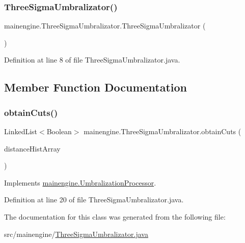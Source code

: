 \subsubsection{\texorpdfstring{Three\+Sigma\+Umbralizator()}{ThreeSigmaUmbralizator()}}
{\footnotesize\ttfamily mainengine.\+Three\+Sigma\+Umbralizator.\+Three\+Sigma\+Umbralizator (\begin{DoxyParamCaption}{ }\end{DoxyParamCaption})}



Definition at line 8 of file Three\+Sigma\+Umbralizator.\+java.



\subsection{Member Function Documentation}
\hypertarget{classmainengine_1_1_three_sigma_umbralizator_a56bfd8fcc856b38e503273e85c0ccf33}{}\label{classmainengine_1_1_three_sigma_umbralizator_a56bfd8fcc856b38e503273e85c0ccf33} 
\subsubsection{\texorpdfstring{obtain\+Cuts()}{obtainCuts()}}
{\footnotesize\ttfamily Linked\+List$<$Boolean$>$ mainengine.\+Three\+Sigma\+Umbralizator.\+obtain\+Cuts (\begin{DoxyParamCaption}\item[{Linked\+List$<$ Double $>$}]{distance\+Hist\+Array }\end{DoxyParamCaption})}



Implements \hyperlink{interfacemainengine_1_1_umbralization_processor_ac96dfbad3a28e5332e2cb95ab8996377}{mainengine.\+Umbralization\+Processor}.



Definition at line 20 of file Three\+Sigma\+Umbralizator.\+java.



The documentation for this class was generated from the following file\+:\begin{DoxyCompactItemize}
\item 
src/mainengine/\hyperlink{_three_sigma_umbralizator_8java}{Three\+Sigma\+Umbralizator.\+java}\end{DoxyCompactItemize}
